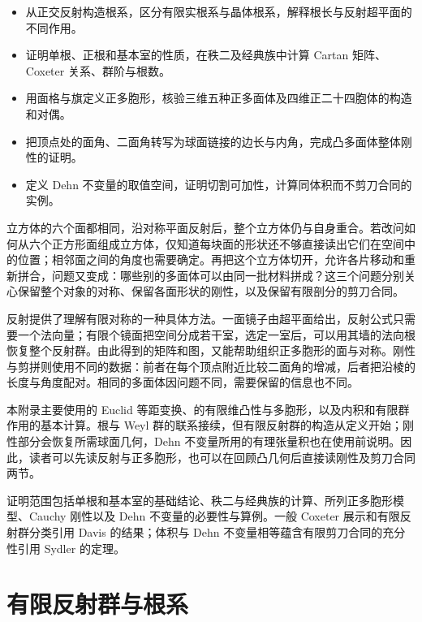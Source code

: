 \begin{learninggoals}
	\begin{itemize}
		\item 从正交反射构造根系，区分有限实根系与晶体根系，解释根长与反射超平面的不同作用。
		\item 证明单根、正根和基本室的性质，在秩二及经典族中计算 Cartan 矩阵、Coxeter 关系、群阶与根数。
		\item 用面格与旗定义正多胞形，核验三维五种正多面体及四维正二十四胞体的构造和对偶。
		\item 把顶点处的面角、二面角转写为球面链接的边长与内角，完成凸多面体整体刚性的证明。
		\item 定义 Dehn 不变量的取值空间，证明切割可加性，计算同体积而不剪刀合同的实例。
	\end{itemize}
\end{learninggoals}

立方体的六个面都相同，沿对称平面反射后，整个立方体仍与自身重合。若改问如何从六个正方形面组成立方体，仅知道每块面的形状还不够直接读出它们在空间中的位置；相邻面之间的角度也需要确定。再把这个立方体切开，允许各片移动和重新拼合，问题又变成：哪些别的多面体可以由同一批材料拼成？这三个问题分别关心保留整个对象的对称、保留各面形状的刚性，以及保留有限剖分的剪刀合同。

\ProseParagraphBreak

反射提供了理解有限对称的一种具体方法。一面镜子由超平面给出，反射公式只需要一个法向量；有限个镜面把空间分成若干室，选定一室后，可以用其墙的法向根恢复整个反射群。由此得到的矩阵和图，又能帮助组织正多胞形的面与对称。刚性与剪拼则使用不同的数据：前者在每个顶点附近比较二面角的增减，后者把沿棱的长度与角度配对。相同的多面体因问题不同，需要保留的信息也不同。

\ProseParagraphBreak

本附录主要使用的 Euclid 等距变换、的有限维凸性与多胞形，以及内积和有限群作用的基本计算。根与 Weyl 群的联系接续，但有限反射群的构造从定义开始；刚性部分会恢复所需球面几何，Dehn 不变量所用的有理张量积也在使用前说明。因此，读者可以先读反射与正多胞形，也可以在回顾凸几何后直接读刚性及剪刀合同两节。

\ProseParagraphBreak

证明范围包括单根和基本室的基础结论、秩二与经典族的计算、所列正多胞形模型、Cauchy 刚性以及 Dehn 不变量的必要性与算例。一般 Coxeter 展示和有限反射群分类引用 Davis 的结果；体积与 Dehn 不变量相等蕴含有限剪刀合同的充分性引用 Sydler 的定理。

\section{有限反射群与根系}
\label{g1:sec:E01}

